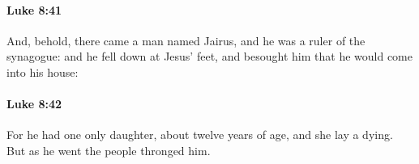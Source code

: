 		\paragraph{Luke 8:41} %
			\label{LUKE-8-41}

			And, behold, there came a man named Jairus, and he was a ruler of the synagogue: and he fell down at Jesus' feet, and besought him that he would come into his house:

			\begin{framed}
			\scriptsize
				\begin{compactdesc}
					\item[SBLG] 
				\end{compactdesc}
			\end{framed}

		\paragraph{Luke 8:42} %
			\label{LUKE-8-42}

			For he had one only daughter, about twelve years of age, and she lay a dying. But as he went the people thronged him.

